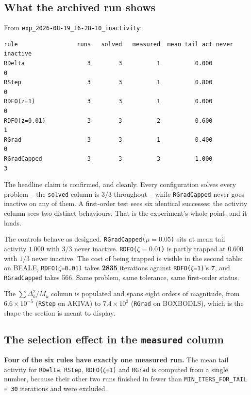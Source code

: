 \documentclass[11pt,a4paper]{article}
\newcommand{\jl}[1]{\texttt{\small #1}}
\newcommand{\file}[1]{\texttt{\small #1}}
\newcommand{\finding}[1]{\textcolor{Alert}{\textbf{#1}}}
\newcommand{\ok}[1]{\textcolor{Good}{#1}}
\begin{document}
\subsection{What the archived run shows}

From \file{exp\_2026-08-19\_16-28-10\_inactivity}:

\begin{lstlisting}
rule                 runs   solved   measured  mean tail act never inactive
RDelta                  3        3          1          0.000              0
RStep                   3        3          1          0.800              0
RDFO(z=1)               3        3          1          0.000              0
RDFO(z=0.01)            3        3          2          0.600              1
RGrad                   3        3          1          0.400              0
RGradCapped             3        3          3          1.000              3
\end{lstlisting}

\ok{The headline claim is confirmed, and cleanly.} Every configuration solves
every problem -- the \jl{solved} column is $3/3$ throughout -- while
\jl{RGradCapped} never goes inactive on any of them. A first-order test sees six
identical successes; the activity column sees two distinct behaviours. That is the
experiment's whole point, and it lands.

The controls behave as designed. \jl{RGradCapped($\mu = 0.05$)} sits at mean tail
activity $1.000$ with $3/3$ never inactive. \jl{RDFO($\zeta = 0.01$)} is partly
trapped at $0.600$ with $1/3$ never inactive. The cost of being trapped is visible
in the second table: on BEALE, \jl{RDFO($\zeta$=0.01)} takes \textbf{2835}
iterations against \jl{RDFO($\zeta$=1)}'s \textbf{7}, and \jl{RGradCapped} takes
566. Same problem, same tolerance, same first-order status.

The $\sum\Delta_k^2/M_k$ column is populated and spans eight orders of magnitude,
from $6.6\times10^{-5}$ (\jl{RStep} on AKIVA) to $7.4\times10^{3}$ (\jl{RGrad} on
BOXBODLS), which is the shape the section is meant to display.

\subsection{The selection effect in the \jl{measured} column}
\label{sec:exp5-selection}

\finding{Four of the six rules have exactly one measured run.} The mean tail
activity for \jl{RDelta}, \jl{RStep}, \jl{RDFO($\zeta$=1)} and \jl{RGrad} is
computed from a single number, because their other two runs finished in fewer than
\jl{MIN\_ITERS\_FOR\_TAIL = 30} iterations and were excluded.
\end{document}
